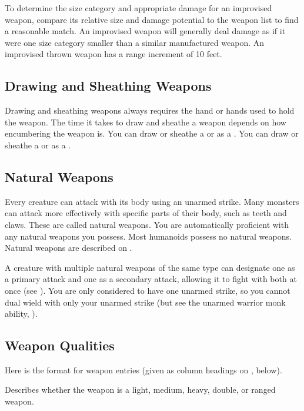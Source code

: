         To determine the size category and appropriate damage for an improvised weapon, compare its relative size and damage potential to the weapon list to find a reasonable match. An improvised weapon will generally deal damage as if it were one size category smaller than a similar manufactured weapon. An improvised thrown weapon has a range increment of 10 feet.

    \subsection{Drawing and Sheathing Weapons}\label{Drawing and Sheathing Weapons}
        Drawing and sheathing weapons always requires the hand or hands used to hold the weapon.
        The time it takes to draw and sheathe a weapon depends on how encumbering the weapon is.
        You can draw or sheathe a  or  as a .
        You can draw or sheathe a  or  as a .

    \subsection{Natural Weapons}\label{Natural Weapons}
        Every creature can attack with its body using an unarmed strike. Many monsters can attack more effectively with specific parts of their body, such as teeth and claws. These are called natural weapons. You are automatically proficient with any natural weapons you possess. Most humanoids possess no natural weapons. Natural weapons are described on .

        A creature with multiple natural weapons of the same type can designate one as a primary attack and one as a secondary attack, allowing it to fight with both at once (see ). You are only considered to have one unarmed strike, so you cannot dual wield with only your unarmed strike (but see the unarmed warrior monk ability, ).

    \subsection{Weapon Qualities}
        Here is the format for weapon entries (given as column headings on , below).

         Describes whether the weapon is a light, medium, heavy, double, or ranged weapon.

